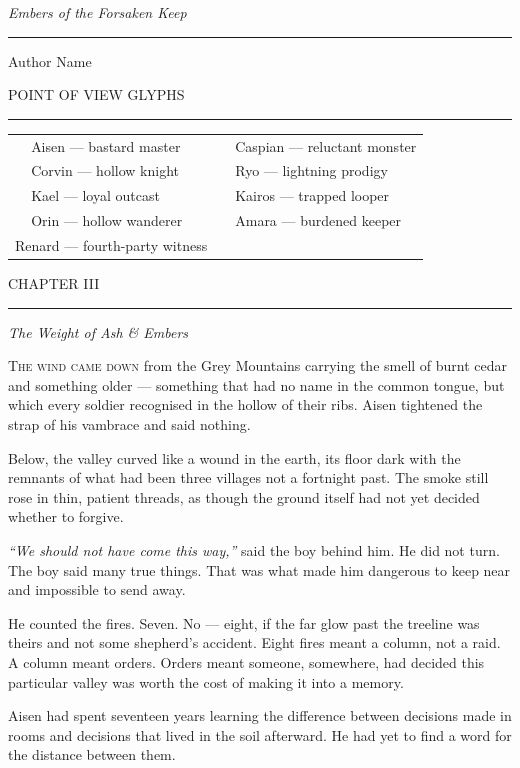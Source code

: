 \documentclass[12pt, a4paper, twoside, openright]{book}
\makeatletter
\newcommand{\DrawGlyph}[3]{%
  \begingroup
    \color{#3}%
    \scalebox{#2}{\csname Glyph#1\endcsname}%
  \endgroup}
\newcommand{\BookTitle}{Embers of the Forsaken Keep}
\newcommand{\BookAuthor}{Author Name}
\newcommand{\CurrentChapterLabel}{III}  %
\newcommand{\SceneLocation}{The Grey Mountains}
\newcommand{\SceneBreak}{%
  \vspace{14pt}%
  \begin{center}%
    {\color{StoneLight}\small
      \textperiodcentered\quad\textperiodcentered\quad\textperiodcentered}%
  \end{center}%
  \vspace{10pt}}
\newcommand{\BookChapter}[2]{%
  \thispagestyle{fancy}%
  \vspace*{2.0cm}%
  \begin{center}%
    {\color{Stone}\fontsize{7}{9}\selectfont\LabelFont
      \addfontfeatures{LetterSpace=10}\MakeUppercase{Chapter #1}}%
    \vspace{0.4cm}

    {\color{StoneLight}\rule{2.8cm}{0.25pt}}%
    \vspace{0.55cm}

    {\color{Ink}\fontsize{21}{26}\selectfont\itshape #2}%
  \end{center}%
  \vspace{1.0cm}%
}
\newcommand{\CharacterReference}{%
  \thispagestyle{fancy}%
  \vspace*{1.8cm}
  \begin{center}
    {\color{Stone}\fontsize{7}{9}\selectfont\LabelFont
      \addfontfeatures{LetterSpace=10}POINT OF VIEW GLYPHS}

    \vspace{0.5cm}
    {\color{StoneLight}\rule{2.8cm}{0.25pt}}
    \vspace{1.2cm}

    \begin{tabular}{@{}c@{\quad}l@{\qquad\qquad}c@{\quad}l@{}}
      \DrawGlyph{Aisen}  {0.18}{ColAisen}   &
        {\color{InkMid}\fontsize{9}{12}\selectfont Aisen — bastard master}    &
      \DrawGlyph{Caspian}{0.18}{ColCaspian} &
        {\color{InkMid}\fontsize{9}{12}\selectfont Caspian — reluctant monster}  \\[12pt]
      \DrawGlyph{Corvin} {0.18}{ColCorvin}  &
        {\color{InkMid}\fontsize{9}{12}\selectfont Corvin — hollow knight}     &
      \DrawGlyph{Ryo}    {0.18}{ColRyo}     &
        {\color{InkMid}\fontsize{9}{12}\selectfont Ryo — lightning prodigy}    \\[12pt]
      \DrawGlyph{Kael}   {0.18}{ColKael}    &
        {\color{InkMid}\fontsize{9}{12}\selectfont Kael — loyal outcast}       &
      \DrawGlyph{Kairos} {0.18}{ColKairos}  &
        {\color{InkMid}\fontsize{9}{12}\selectfont Kairos — trapped looper}    \\[12pt]
      \DrawGlyph{Orin}   {0.18}{ColOrin}    &
        {\color{InkMid}\fontsize{9}{12}\selectfont Orin — hollow wanderer}     &
      \DrawGlyph{Amara}  {0.18}{ColAmara}   &
        {\color{InkMid}\fontsize{9}{12}\selectfont Amara — burdened keeper}    \\[12pt]
      \multicolumn{2}{c}{%
        \DrawGlyph{Renard}{0.18}{ColRenard}\quad
        {\color{InkMid}\fontsize{9}{12}\selectfont Renard — fourth-party witness}}
        & & \\
    \end{tabular}
  \end{center}%
}
\makeatother
\begin{document}
\thispagestyle{empty}
\renewcommand{\SceneLocation}{~}

\vspace*{4.5cm}
\begin{center}
  {\color{Ink}\fontsize{28}{34}\selectfont\itshape\BookTitle}

  \vspace{0.6cm}
  {\color{StoneLight}\rule{2.8cm}{0.25pt}}
  \vspace{0.6cm}

  {\color{Stone}\fontsize{10}{13}\selectfont\BookAuthor}
\end{center}
\clearpage

\renewcommand{\SceneLocation}{~}
\CharacterReference
\clearpage

\renewcommand{\SceneLocation}{The Grey Mountains}

\setcounter{page}{47}

\BookChapter{\CurrentChapterLabel}{The Weight of Ash \& Embers}

\lettrine[lines=3, lraise=0.05]{T}{he wind came down}
from the Grey Mountains carrying the smell of burnt cedar and
something older --- something that had no name in the common tongue,
but which every soldier recognised in the hollow of their ribs.
Aisen tightened the strap of his vambrace and said nothing.

Below, the valley curved like a wound in the earth, its floor dark
with the remnants of what had been three villages not a fortnight
past. The smoke still rose in thin, patient threads, as though the
ground itself had not yet decided whether to forgive.

{\color{Stone}\itshape ``We should not have come this way,''} said
the boy behind him. He did not turn. The boy said many true things.
That was what made him dangerous to keep near and impossible to
send away.

\SceneBreak

He counted the fires. Seven. No --- eight, if the far glow past the
treeline was theirs and not some shepherd's accident. Eight fires
meant a column, not a raid. A column meant orders. Orders meant
someone, somewhere, had decided this particular valley was worth
the cost of making it into a memory.

Aisen had spent seventeen years learning the difference between
decisions made in rooms and decisions that lived in the soil
afterward. He had yet to find a word for the distance between them.
\end{document}
